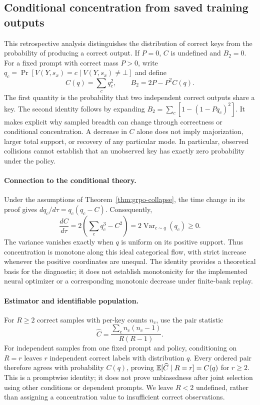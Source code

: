 \subsection{Conditional concentration from saved training outputs}
\label{app:conditional-concentration}

This retrospective analysis distinguishes the distribution of correct keys
from the probability of producing a correct output. If $P=0$, $C$ is undefined
and $B_2=0$. For a fixed prompt with
correct mass $P>0$, write $q_c=\Pr[V(Y,s_x)=c\mid V(Y,s_x)\ne\bot]$ and define
\begin{equation}
 C(q)=\sum_c q_c^2,\qquad B_2=2P-P^2C(q).
 \label{eq:collision-breadth-bridge}
\end{equation}
The first quantity is the probability that two independent correct outputs
share a key. The second identity follows by expanding
$B_2=\sum_c[1-(1-Pq_c)^2]$. It makes explicit why sampled breadth can
change through correctness or conditional concentration. A decrease in $C$
alone does not imply majorization, larger total support, or recovery of any
particular mode. In particular, observed collisions cannot establish that
an unobserved key has exactly zero probability under the policy.

\paragraph{Connection to the conditional theory.}
Under the assumptions of Theorem~\ref{thm:grpo-collapse}, the time change in
its proof gives $dq_c/d\tau=q_c(q_c-C)$. Consequently,
\begin{equation}
 \frac{dC}{d\tau}
 =2\left(\sum_c q_c^3-C^2\right)
 =2\operatorname{Var}_{c\sim q}(q_c)\ge0.
 \label{eq:collision-flow}
\end{equation}
The variance vanishes exactly when $q$ is uniform on its positive support.
Thus concentration is monotone along this ideal categorical flow, with
strict increase whenever the positive coordinates are unequal. The identity
provides a theoretical basis for the diagnostic; it does not establish
monotonicity for the implemented neural optimizer or a corresponding
monotonic decrease under finite-bank replay.

\paragraph{Estimator and identifiable population.}
For $R\ge2$ correct samples with per-key counts $n_c$, use the pair statistic
\begin{equation}
 \widehat C=\frac{\sum_c n_c(n_c-1)}{R(R-1)}.
 \label{eq:training-collision-estimator}
\end{equation}
For independent samples from one fixed prompt and policy, conditioning on
$R=r$ leaves $r$ independent correct labels with distribution $q$. Every
ordered pair therefore agrees with probability $C(q)$, proving
$\mathbb E[\widehat C\mid R=r]=C(q)$ for $r\ge2$. This is a promptwise identity;
it does not prove unbiasedness after joint selection using other conditions
or dependent prompts. We leave $R<2$ undefined, rather than assigning a
concentration value to insufficient correct observations.

